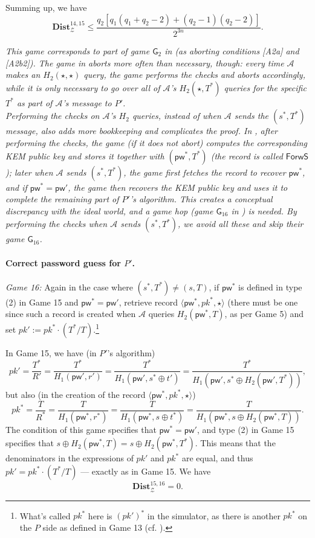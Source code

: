 \documentclass{article}
\theoremstyle{plain}
\theoremstyle{definition}
\theoremstyle{remark}
\newcommand{\adv}{\mathcal{A}}
\newcommand{\env}{\mathcal{Z}}
\newcommand{\Dist}{\mathbf{Dist}}
\newcommand{\pw}{\mathsf{pw}}
\begin{document}
Summing up, we have
\[
\Dist_\env^{14,15} \leq \frac{q_2[q_1(q_1+q_2-2)+(q_2-1)(q_2-2)]}{2^{3n}}.
\]

\emph{{\color{red}This game corresponds to part of game $\mathsf{G}_2$ in \cite{EPRINT:ArrBarJar25} (as aborting conditions [A2a] and [A2b2]). The game in \cite{EPRINT:ArrBarJar25} aborts more often than necessary, though: every time $\adv$ makes an $H_2(\star,\star)$ query, the game performs the checks and aborts accordingly, while it is only necessary to go over all of $\adv$'s $H_2(\star,T^*)$ queries for the specific $T^*$ as part of $\adv$'s message to $P'$. \\
\indent Performing the checks on $\adv$'s $H_2$ queries, instead of when $\adv$ sends the $(s^*,T^*)$ message, also adds more bookkeeping and complicates the proof. In \cite{EPRINT:ArrBarJar25}, after performing the checks, the game (if it does not abort) computes the corresponding KEM public key and stores it together with $(\pw^*,T^*)$ (the record is called $\mathsf{ForwS}$); later when $\adv$ sends $(s^*,T^*)$, the game first fetches the record to recover $\pw^*$, and if $\pw^* = \pw'$, the game then recovers the KEM public key and uses it to complete the remaining part of $P'$'s algorithm. This creates a conceptual discrepancy with the ideal world, and a game hop (game $\mathsf{G}_{16}$ in \cite{EPRINT:ArrBarJar25}) is needed. By performing the checks when $\adv$ sends $(s^*,T^*)$, we avoid all these and skip their game $\mathsf{G}_{16}$.
}}

\paragraph{Correct password guess for $P'$.}
\mbox{}

\medskip\noindent\emph{Game 16:} Again in the case where $(s^*,T^*) \neq (s,T)$, if $\pw^*$ is defined in type (2) in Game 15 and $\pw^* = \pw'$, retrieve record $\langle\pw^*,pk^*,\star\rangle$ (there must be one since such a record is created when $\adv$ queries $H_2(\pw^*,T)$, as per Game 5) and set $pk' := pk^* \cdot (T^*/T)$.\footnote{What's called $pk^*$ here is $(pk')^*$ in the simulator, as there is another $pk^*$ on the $P$ side as defined in Game 13 (cf. ).}

In Game 15, we have (in $P'$'s algorithm)
\[
pk' = \frac{T^*}{R'} = \frac{T^*}{H_1(\pw',r')} = \frac{T^*}{H_1(\pw',s^* \oplus t')} = \frac{T^*}{H_1(\pw',s^* \oplus H_2(\pw',T^*))},
\]
but also (in the creation of the record $\langle\pw^*,pk^*,\star\rangle$)
\[
pk^* = \frac{T}{R^*} = \frac{T}{H_1(\pw^*,r^*)} = \frac{T}{H_1(\pw^*,s \oplus t^*)} = \frac{T}{H_1(\pw^*,s \oplus H_2(\pw^*,T))}.
\]
The condition of this game specifies that $\pw^* = \pw'$, and type (2) in Game 15 specifies that $s \oplus H_2(\pw^*,T) = s \oplus H_2(\pw^*,T^*)$. This means that the denominators in the expressions of $pk'$ and $pk^*$ are equal, and thus $pk' = pk^* \cdot (T^*/T)$ --- exactly as in Game 15. We have
\[
\Dist_\env^{15,16} = 0.
\]
\end{document}
